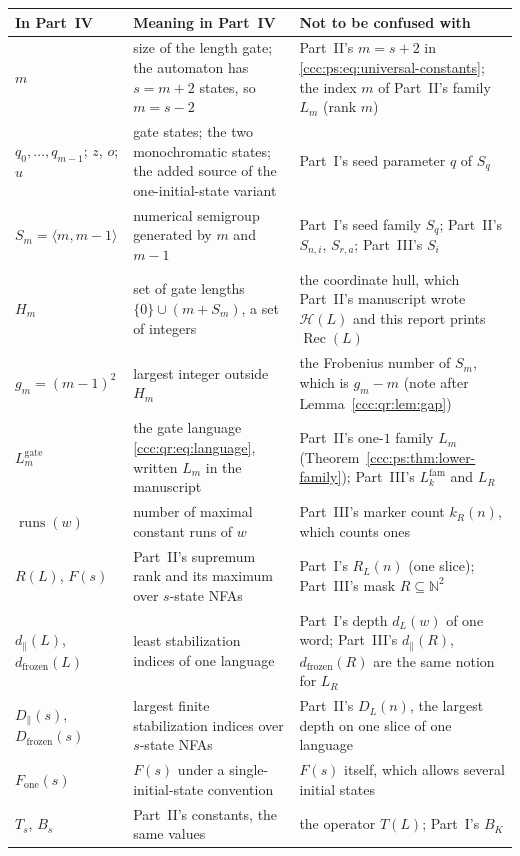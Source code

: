 \documentclass[11pt,letterpaper]{article}
\theoremstyle{definition}
\theoremstyle{remark}
\newcommand{\N}{\mathbb N}
\newcommand{\rec}{\operatorname{Rec}}
\newcommand{\runs}{\operatorname{runs}}
\newcommand{\Lgate}[1]{L^{\mathrm{gate}}_{#1}}
\begin{document}
\begin{center}\small
\begin{tabular}{@{}>{\raggedright\arraybackslash}p{}>{\raggedright\arraybackslash}p{}>{\raggedright\arraybackslash}p{}@{}}
\toprule
\textbf{In Part~IV} & \textbf{Meaning in Part~IV} & \textbf{Not to be confused with}\\
\midrule
$m$ & size of the length gate; the automaton has $s=m+2$ states, so $m=s-2$ & Part~II's $m=s+2$ in \eqref{ccc:ps:eq:universal-constants}; the index $m$ of Part~II's family $L_m$ (rank $m$)\\[3pt]
$q_0,\ldots,q_{m-1}$; $z$, $o$; $u$ & gate states; the two monochromatic states; the added source of the one-initial-state variant & Part~I's seed parameter $q$ of $S_q$\\[3pt]
$S_m=\langle m,m-1\rangle$ & numerical semigroup generated by $m$ and $m-1$ & Part~I's seed family $S_q$; Part~II's $S_{n,i}$, $S_{r,a}$; Part~III's $S_i$\\[3pt]
$H_m$ & set of gate lengths $\{0\}\cup(m+S_m)$, a set of integers & the coordinate hull, which Part~II's manuscript wrote $\mathcal H(L)$ and this report prints $\rec(L)$\\[3pt]
$g_m=(m-1)^2$ & largest integer outside $H_m$ & the Frobenius number of $S_m$, which is $g_m-m$ (note after Lemma~\ref{ccc:qr:lem:gap})\\[3pt]
$\Lgate m$ & the gate language \eqref{ccc:qr:eq:language}, written $L_m$ in the manuscript & Part~II's one-$1$ family $L_m$ (Theorem~\ref{ccc:ps:thm:lower-family}); Part~III's $L^{\mathrm{fam}}_k$ and $L_R$\\[3pt]
$\runs(w)$ & number of maximal constant runs of $w$ & Part~III's marker count $k_R(n)$, which counts ones\\[3pt]
$R(L)$, $F(s)$ & Part~II's supremum rank and its maximum over $s$-state NFAs & Part~I's $R_L(n)$ (one slice); Part~III's mask $R\subseteq\N^2$\\[3pt]
$d_\parallel(L)$, $d_{\mathrm{frozen}}(L)$ & least stabilization indices of one language & Part~I's depth $d_L(w)$ of one word; Part~III's $d_\parallel(R)$, $d_{\mathrm{frozen}}(R)$ are the same notion for $L_R$\\[3pt]
$D_\parallel(s)$, $D_{\mathrm{frozen}}(s)$ & largest finite stabilization indices over $s$-state NFAs & Part~II's $D_L(n)$, the largest depth on one slice of one language\\[3pt]
$F_{\mathrm{one}}(s)$ & $F(s)$ under a single-initial-state convention & $F(s)$ itself, which allows several initial states\\[3pt]
$T_s$, $B_s$ & Part~II's constants, the same values & the operator $T(L)$; Part~I's $B_K$\\
\bottomrule
\end{tabular}
\end{center}
\end{document}
